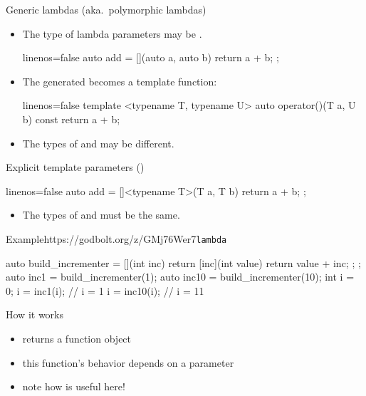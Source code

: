 \begin{advanced}
\begin{frame}[fragile]
  \begin{block}{Generic lambdas (aka.\ polymorphic lambdas)}
    \begin{itemize}
      \item The type of lambda parameters may be .
      \begin{cppcode*}{linenos=false}
        auto add = [](auto a, auto b) { return a + b; };
      \end{cppcode*}
      \item The generated  becomes a template function:
      \begin{cppcode*}{linenos=false}
        template <typename T, typename U>
        auto operator()(T a, U b) const { return a + b; }
      \end{cppcode*}
      \item The types of  and  may be different.
    \end{itemize}
  \end{block}
  \begin{block}{Explicit template parameters ()}
    \begin{cppcode*}{linenos=false}
      auto add = []<typename T>(T a, T b)
      { return a + b; };
    \end{cppcode*}
    \begin{itemize}
      \item The types of  and  must be the same.
    \end{itemize}
  \end{block}
\end{frame}

\begin{frame}[fragile]
  \begin{exampleblockGB}{Example}{https://godbolt.org/z/GMj76Wer7}{\texttt{lambda}}
    \begin{cppcode*}{}
      auto build_incrementer = [](int inc) {
        return [inc](int value) { return value + inc; };
      };
      auto inc1 = build_incrementer(1);
      auto inc10 = build_incrementer(10);
      int i = 0;
      i = inc1(i);   // i = 1
      i = inc10(i);  // i = 11
    \end{cppcode*}
  \end{exampleblockGB}
  \begin{block}{How it works}
    \begin{itemize}
      \item {} returns a function object
      \item this function's behavior depends on a parameter
      \item note how  is useful here!
    \end{itemize}
  \end{block}
\end{frame}


\end{advanced}
